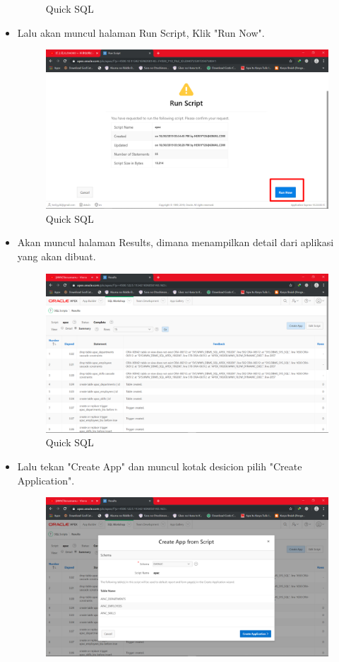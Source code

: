 \documentclass[12pt, times new roman]{article}
\begin{document}
\begin{itemize}
\begin{figure}[!htpb]
	\caption{Quick SQL}
\end{figure}
\item Lalu akan muncul halaman Run Script, Klik "Run Now".
\begin{figure}[!htpb]
	\centering
	\includegraphics[width=12cm]{figures/Screenshot_20.png}
	\caption{Quick SQL}
\end{figure}
\item Akan muncul halaman Results, dimana menampilkan detail dari aplikasi yang akan dibuat.
\begin{figure}[!htpb]
	\centering
	\includegraphics[width=12cm]{figures/Screenshot_21.png}
	\caption{Quick SQL}
\end{figure}
\item Lalu tekan "Create App" dan muncul kotak desicion pilih "Create Application".
\begin{figure}[!htpb]
	\centering
	\includegraphics[width=12cm]{figures/Screenshot_22.png}

\end{figure}
\end{itemize}
\end{document}
